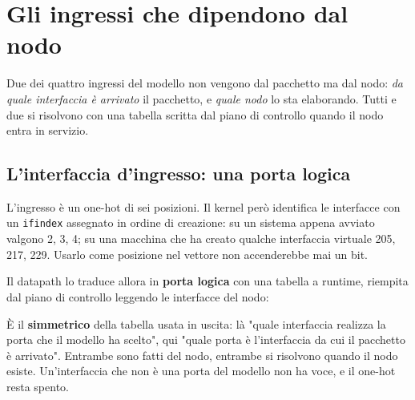 \documentclass[11pt,a4paper,oneside]{report}
\begin{document}
\chapter{Gli ingressi che dipendono dal nodo}

Due dei quattro ingressi del modello non vengono dal pacchetto ma dal nodo:
\emph{da quale interfaccia è arrivato} il pacchetto, e \emph{quale nodo} lo sta
elaborando. Tutti e due si risolvono con una tabella scritta dal piano di
controllo quando il nodo entra in servizio.

\section{L'interfaccia d'ingresso: una porta logica}

L'ingresso è un one-hot di sei posizioni. Il kernel però identifica le
interfacce con un \texttt{ifindex} assegnato in ordine di creazione: su un
sistema appena avviato valgono 2, 3, 4; su una macchina che ha creato qualche
interfaccia virtuale 205, 217, 229. Usarlo come posizione nel vettore non
accenderebbe mai un bit.

Il datapath lo traduce allora in \textbf{porta logica} con una tabella a
runtime, riempita dal piano di controllo leggendo le interfacce del nodo:

\begin{center}
\end{center}

È il \textbf{simmetrico} della tabella usata in uscita: là "quale interfaccia
realizza la porta che il modello ha scelto", qui "quale porta è l'interfaccia da
cui il pacchetto è arrivato". Entrambe sono fatti del nodo, entrambe si
risolvono quando il nodo esiste. Un'interfaccia che non è una porta del modello
non ha voce, e il one-hot resta spento.
\end{document}
